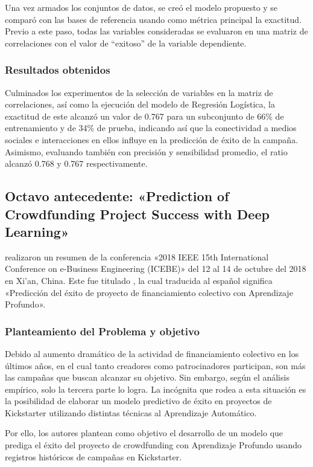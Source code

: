 Una vez armados los conjuntos de datos, se creó el modelo propuesto y se comparó con las bases de referencia usando como métrica principal la exactitud. Previo a este paso, todas las variables consideradas se evaluaron en una matriz de correlaciones con el valor de “exitoso” de la variable dependiente.

\subsubsection{Resultados obtenidos}
Culminados los experimentos de la selección de variables en la matriz de correlaciones, así como la ejecución del modelo de Regresión Logística, la exactitud de este alcanzó un valor de 0.767 para un subconjunto de 66\% de entrenamiento y de 34\% de prueba, indicando así que la conectividad a medios sociales e interacciones en ellos influye en la predicción de éxito de la campaña. Asimismo, evaluando también con precisión y sensibilidad promedio, el ratio alcanzó 0.768 y 0.767 respectivamente.


\subsection{Octavo antecedente: «Prediction of Crowdfunding Project Success with Deep Learning» \citep*{pr_yu2018deeplearning}}
\citeauthor{pr_yu2018deeplearning} realizaron un resumen de la conferencia «2018 IEEE 15th International Conference on e-Business Engineering (ICEBE)» del 12 al 14 de octubre del 2018 en Xi'an, China. Este fue titulado , la cual traducida al español significa «Predicción del éxito de proyecto de financiamiento colectivo con Aprendizaje Profundo».

\subsubsection{Planteamiento del Problema y objetivo}
Debido al aumento dramático de la actividad de financiamiento colectivo en los últimos años, en el cual tanto creadores como patrocinadores participan, son más las campañas que buscan alcanzar su objetivo. Sin embargo, según el análisis empírico, solo la tercera parte lo logra. La incógnita que rodea a esta situación es la posibilidad de elaborar un modelo predictivo de éxito en proyectos de Kickstarter utilizando distintas técnicas al Aprendizaje Automático.

Por ello, los autores plantean como objetivo el desarrollo de un modelo que prediga el éxito del proyecto de crowdfunding con Aprendizaje Profundo usando registros históricos de campañas en Kickstarter.


